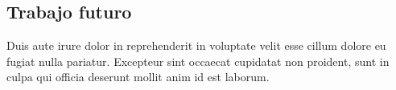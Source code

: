 \documentclass[esp]{cesvi-class}
\begin{document}
\subsection{Trabajo futuro}
Duis aute irure dolor in reprehenderit in voluptate velit esse cillum dolore eu fugiat nulla pariatur. Excepteur sint occaecat cupidatat non proident, sunt in culpa qui officia deserunt mollit anim id est laborum.

\end{document}
